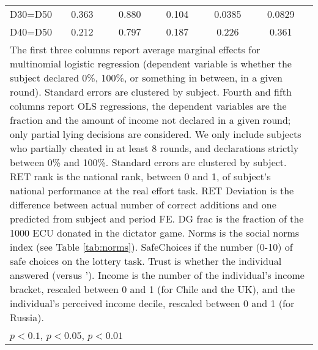 \begin{tabular}{l|cccccc|cc|cc}
D30=D50         &    0.363         &         &    0.880         &         &    0.104         &         &   0.0385         &         &   0.0829         &         \\
D40=D50         &    0.212         &         &    0.797         &         &    0.187         &         &    0.226         &         &    0.361         &         \\
\hline\hline
\multicolumn{11}{p{18cm}}{\tiny The first three columns report average marginal effects for multinomial logistic regression (dependent variable is whether the subject declared 0\%, 100\%, or something in between, in a given round). Standard errors are clustered by subject. Fourth and fifth columns report OLS regressions, the dependent variables are the fraction and the amount of income not declared in a given round; only partial lying decisions are considered. We only include subjects who partially cheated in at least 8 rounds, and declarations strictly between 0\% and 100\%. Standard errors are clustered by subject. RET rank is the national rank, between 0 and 1, of subject's national performance at the real effort task. RET Deviation is the difference between actual number of correct additions and one predicted from subject and period FE. DG frac is the fraction of the 1000 ECU donated in the dictator game. Norms is the social norms index (see Table \ref{tab:norms}). SafeChoices if the number (0-10) of safe choices on the lottery task. Trust is whether the individual answered  (versus '). Income is the number of the individual's income bracket, rescaled between 0 and 1 (for Chile and the UK), and the individual's perceived income decile, rescaled between 0 and 1 (for Russia).}\\
\multicolumn{11}{l}{\tiny \sym{*} \(p<0.1\), \sym{**} \(p<0.05\), \sym{***} \(p<0.01\)}\\
\end{tabular}